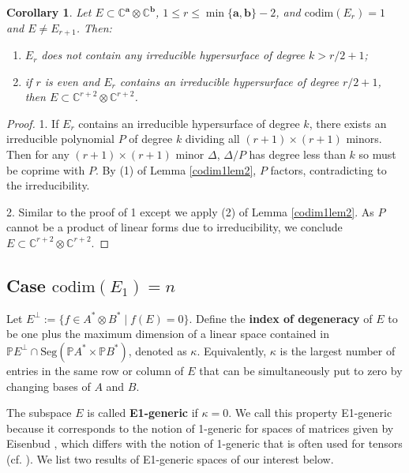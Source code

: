 \documentclass[10pt]{article} %
\newcommand{\aaa}{\mathbf{a}}
\newcommand{\bbb}{\mathbf{b}}
\newcommand{\ot}{\otimes}
\newtheorem{cor}[thm]{Corollary}
\theoremstyle{definition}
\begin{document}
\begin{cor}\label{codim1cor}
Let $E\subset\mathbb{C}^{\aaa}\otimes\mathbb{C}^{\bbb}$, $1\leq r\leq\min\{\aaa,\bbb\}-2$, and $\mathrm{codim}(E_r)=1$ and $E\neq E_{r+1}$. Then:
\begin{enumerate}
    \item $E_r$ does not contain any irreducible hypersurface of degree $k>r/2+1$;

    \item if $r$ is even and $E_r$ contains an irreducible hypersurface of degree $r/2+1$, then $E\subset \mathbb{C}^{r+2}\otimes \mathbb{C}^{r+2}$.
\end{enumerate}
\end{cor}

\begin{proof}
1. If $E_r$ contains an irreducible hypersurface of degree $k$, there exists an irreducible polynomial $P$ of degree $k$ dividing all $(r+1)\times(r+1)$ minors. Then for any $(r+1)\times(r+1)$ minor $\Delta$, $\Delta/P$ has degree less than $k$ so must be coprime with $P$. By (1) of Lemma \ref{codim1lem2}, $P$ factors, contradicting to the irreducibility.

2. Similar to the proof of 1 except we apply (2) of Lemma \ref{codim1lem2}. As $P$ cannot be a product of linear forms due to irreducibility, we conclude $E\subset\mathbb{C}^{r+2}\otimes \mathbb{C}^{r+2}$.
\end{proof}


\subsection{Case $\mathrm{codim}(E_1)= n$}\label{E1section}
Let $E^{\perp}:=\{f\in A^*\ot B^*\mid f(E)=0\}$. Define the \textbf{index of degeneracy} of $E$ to be one plus the maximum dimension of a linear space contained in $\mathbb{P}E^{\perp}\cap\mathrm{Seg}(\mathbb{P}A^* \times \mathbb{P}B^*)$, denoted as $\kappa$. Equivalently, $\kappa$ is the largest number of entries in the same row or column of $E$ that can be simultaneously put to zero by changing bases of $A$ and $B$. 

The subspace $E$ is called \textbf{E1-generic} if $\kappa=0$. We call this property E1-generic because it corresponds to the notion of 1-generic for spaces of matrices given by Eisenbud \cite{Eis88}, which differs with the notion of 1-generic that is often used for tensors (cf. \cite{1generic}). We list two results of E1-generic spaces of our interest below.
\end{document}
